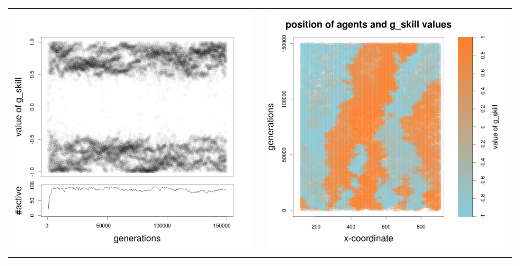 \documentclass[a4paper,10pt]{article}
\begin{document}
\begin{table}[h!]
\begin{tabular}{cc}
 \newline
 \includegraphics[width=\imgSize]{images/5StaticEnv/Gplot9_staticEnv1}&\includegraphics[width=\imgSize]{images/5StaticEnv/Gplot9Static_staticEnv1}\\
 \end{tabular}

\end{table}
\end{document}
